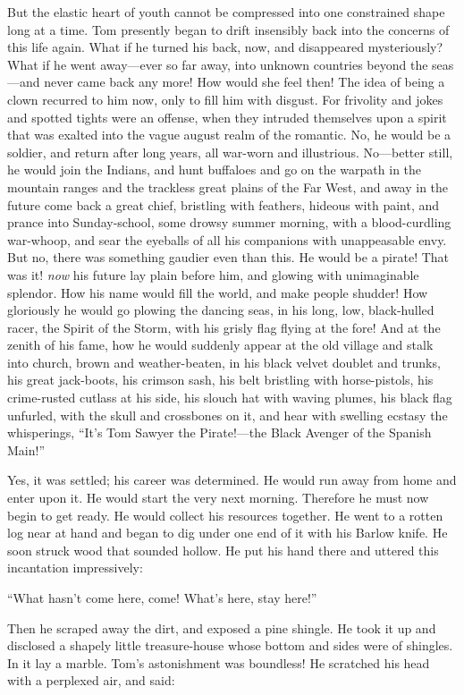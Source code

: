 \documentclass{book}
\begin{document}
But the elastic heart of youth cannot be compressed into one constrained shape long at a time. Tom presently began to drift insensibly back into the concerns of this life again. What if he turned his back, now, and disappeared mysteriously? What if he went away—ever so far away, into unknown countries beyond the seas—and never came back any more! How would she feel then! The idea of being a clown recurred to him now, only to fill him with disgust. For frivolity and jokes and spotted tights were an offense, when they intruded themselves upon a spirit that was exalted into the vague august realm of the romantic. No, he would be a soldier, and return after long years, all war-worn and illustrious. No—better still, he would join the Indians, and hunt buffaloes and go on the warpath in the mountain ranges and the trackless great plains of the Far West, and away in the future come back a great chief, bristling with feathers, hideous with paint, and prance into Sunday-school, some drowsy summer morning, with a blood-curdling war-whoop, and sear the eyeballs of all his companions with unappeasable envy. But no, there was something gaudier even than this. He would be a pirate! That was it! \emph{now} his future lay plain before him, and glowing with unimaginable splendor. How his name would fill the world, and make people shudder! How gloriously he would go plowing the dancing seas, in his long, low, black-hulled racer, the Spirit of the Storm, with his grisly flag flying at the fore! And at the zenith of his fame, how he would suddenly appear at the old village and stalk into church, brown and weather-beaten, in his black velvet doublet and trunks, his great jack-boots, his crimson sash, his belt bristling with horse-pistols, his crime-rusted cutlass at his side, his slouch hat with waving plumes, his black flag unfurled, with the skull and crossbones on it, and hear with swelling ecstasy the whisperings, “It’s Tom Sawyer the Pirate!—the Black Avenger of the Spanish Main!”

Yes, it was settled; his career was determined. He would run away from home and enter upon it. He would start the very next morning. Therefore he must now begin to get ready. He would collect his resources together. He went to a rotten log near at hand and began to dig under one end of it with his Barlow knife. He soon struck wood that sounded hollow. He put his hand there and uttered this incantation impressively:

“What hasn’t come here, come! What’s here, stay here!”

Then he scraped away the dirt, and exposed a pine shingle. He took it up and disclosed a shapely little treasure-house whose bottom and sides were of shingles. In it lay a marble. Tom’s astonishment was boundless! He scratched his head with a perplexed air, and said:
\end{document}
